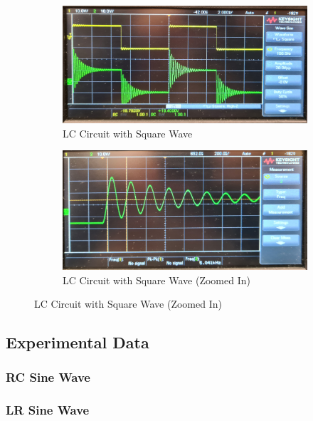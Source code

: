 \documentclass[a4paper,12pt]{article}
\begin{document}
\begin{figure}[H]
  \centering
  \begin{subfigure}{.5\textwidth}
    \centering
    \includegraphics[width=.9\linewidth]{../data/20211116_110612-mod.jpg}
    \caption{LC Circuit with Square Wave}
  \end{subfigure}%
  \begin{subfigure}{.5\textwidth}
    \centering
    \includegraphics[width=.9\linewidth]{../data/20211116_110834-mod.jpg}
    \caption{LC Circuit with Square Wave (Zoomed In)}
  \end{subfigure}
\end{figure}

\pagebreak

\subsection{Experimental Data}

\subsubsection{RC Sine Wave}


\subsubsection{LR Sine Wave}

\end{document}

